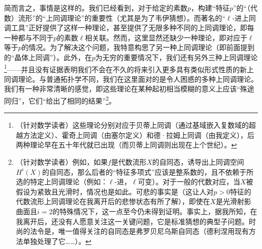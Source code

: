 简而言之，事情是这样的。我们已经看到，对于给定的素数$p$，构建“特征$p$”的“（代数）流形”的“上同调理论”的重要性（尤其是为了韦伊猜想）。而著名的“$\ell$-进上同调工具”正好提供了这样一种理论，甚至提供了无限多种不同的上同调理论，即每一种都与不同于$p$的素数$\ell$相关联。然而，这里显然还缺少一种理论，即对应于$\ell$等于$p$的情况。为了解决这个问题，我特意构思了另一种上同调理论（即前面提到的“晶体上同调”）。此外，在$p$为无穷的重要情况下，我们还有另外三种上同调理论\footnote{（针对数学读者）这些理论分别对应于贝蒂上同调（通过基域嵌入复数域的超越方法定义）、霍奇上同调（由塞尔定义）和德·拉姆上同调（由我定义），后两种理论早在五十年代就已出现（而贝蒂上同调则出现在上个世纪）。}——并且没有证据表明我们不会在不久的将来引入更多具有类似形式性质的新上同调理论。与普通拓扑学不同，我们在这里面对的是令人困惑的多种上同调理论。我们有一种非常清晰的感觉，即这些理论在某种起初相当模糊的意义上应该“殊途同归”，它们“给出了相同的结果”\footnote{（针对数学读者）例如，如果$f$是代数流形$X$的自同态，诱导出上同调空间$H^{i}(X)$的自同态，那么后者的“特征多项式”应该是整系数的，且不依赖于所选的特定上同调理论（例如：$\ell$-进，$\ell$可变）。对于一般的代数对应，当$X$被假设为紧致且光滑时，情况也是如此。可悲的事实是（这让人对$p>0$特征的代数流形上同调理论在我离开后的悲惨状态有所了解），即使在$X$是光滑射影曲面且$i=2$的特殊情况下，这一点至今仍未得到证明。事实上，据我所知，在我离开后，还没有人愿意关注这一关键问题，它是标准猜想的典型子问题。时尚的法令是，唯一值得关注的自同态是弗罗贝尼乌斯自同态（德利涅用现有方法单独处理了它……）。}。

